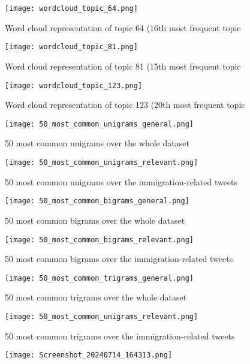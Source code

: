 \documentclass[11pt]{article}
\begin{document}
\begin{figure}[H]
    \centering
    \texttt{[image: wordcloud\_topic\_64.png]}
    \caption{Word cloud representation of topic 64 (16th most frequent topic}
    \label{fig:topic64}
\end{figure}

\begin{figure}[H]
    \centering
    \texttt{[image: wordcloud\_topic\_81.png]}
    \caption{Word cloud representation of topic 81 (15th most frequent topic}
    \label{fig:topic81}
\end{figure}

\begin{figure}[H]
    \centering
    \texttt{[image: wordcloud\_topic\_123.png]}
    \caption{Word cloud representation of topic 123 (20th most frequent topic}
    \label{fig:topic123}
\end{figure}

\begin{figure*}[htbp]
    \centering
    \texttt{[image: 50\_most\_common\_unigrams\_general.png]}
    \caption{50 most common unigrams over the whole dataset}
    \label{fig:uni_gen}
\end{figure*}

\begin{figure*}[htbp]
    \centering
    \texttt{[image: 50\_most\_common\_unigrams\_relevant.png]}
    \caption{50 most common unigrams over the immigration-related tweets}
    \label{fig:uni_rel}
\end{figure*}

\begin{figure*}[htbp]
    \centering
    \texttt{[image: 50\_most\_common\_bigrams\_general.png]}
    \caption{50 most common bigrams over the whole dataset}
    \label{fig:bi_gen}
\end{figure*}

\begin{figure*}[htbp]
    \centering
    \texttt{[image: 50\_most\_common\_bigrams\_relevant.png]}
    \caption{50 most common bigrams over the immigration-related tweets}
    \label{fig:bi_rel}
\end{figure*}

\begin{figure*}[htbp]
    \centering
    \texttt{[image: 50\_most\_common\_trigrams\_general.png]}
    \caption{50 most common trigrams over the whole dataset}
    \label{fig:tri_gen}
\end{figure*}

\begin{figure*}[htbp]
    \centering
    \texttt{[image: 50\_most\_common\_unigrams\_relevant.png]}
    \caption{50 most common trigrams over the immigration-related tweets}
    \label{fig:tri_rel}
\end{figure*}


\begin{figure*}[htbp]
    \centering
    \texttt{[image: Screenshot\_20240714\_164313.png]}
    \label{fig:tri_rel}
\end{figure*}
\end{document}
